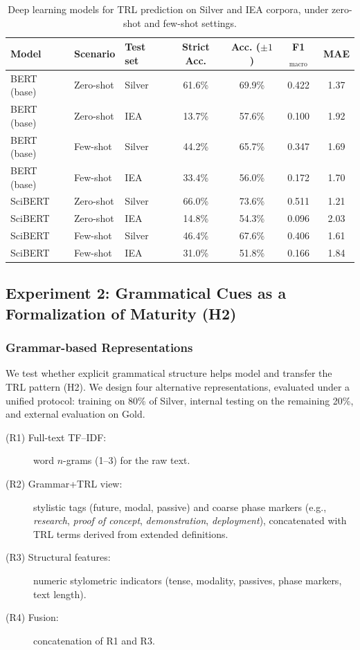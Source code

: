 \documentclass[runningheads]{llncs}
\begin{document}
\begin{table}[b]
\centering
\small
\begin{tabular}{l l l c c c c}
\toprule
Model & Scenario & Test set & Strict Acc. & Acc. ($\pm 1$) & F1$_\text{macro}$ & MAE \\
\midrule
BERT (base) & Zero-shot & Silver & 61.6\% & 69.9\% & 0.422 & 1.37 \\
BERT (base) & Zero-shot & IEA    & 13.7\% & 57.6\% & 0.100 & 1.92 \\
BERT (base) & Few-shot  & Silver & 44.2\% & 65.7\% & 0.347 & 1.69 \\
BERT (base) & Few-shot  & IEA    & 33.4\% & 56.0\% & 0.172 & 1.70 \\
\midrule
SciBERT      & Zero-shot & Silver & 66.0\% & 73.6\% & 0.511 & 1.21 \\
SciBERT      & Zero-shot & IEA    & 14.8\% & 54.3\% & 0.096 & 2.03 \\
SciBERT      & Few-shot  & Silver & 46.4\% & 67.6\% & 0.406 & 1.61 \\
SciBERT      & Few-shot  & IEA    & 31.0\% & 51.8\% & 0.166 & 1.84 \\
\bottomrule
\end{tabular}
\caption{Deep learning models for TRL prediction on Silver and IEA corpora, under zero-shot and few-shot settings.}
\label{tab:deep_trl_iea}
\end{table}

\subsection{Experiment 2: Grammatical Cues as a Formalization of Maturity (H2)}
\label{sec:exp2}

\subsubsection{Grammar-based Representations}
\label{gramm}
We test whether explicit grammatical structure helps model and transfer the TRL
pattern (H2). We design four alternative representations, evaluated under a
unified protocol: training on 80\% of Silver, internal testing on the remaining
20\%, and external evaluation on Gold.

\begin{description}
    \item[(R1) Full-text TF--IDF:] word $n$-grams (1--3) for the raw text.
    \item[(R2) Grammar+TRL view:] stylistic tags (future, modal, passive) and
    coarse phase markers (e.g., \emph{research}, \emph{proof of concept},
    \emph{demonstration}, \emph{deployment}), concatenated with TRL terms derived
    from extended definitions.
    \item[(R3) Structural features:] numeric stylometric indicators (tense,
    modality, passives, phase markers, text length).
    \item[(R4) Fusion:] concatenation of R1 and R3.
\end{description}
\end{document}
